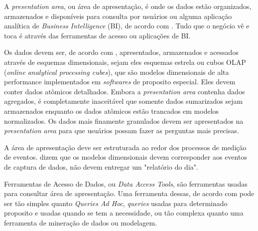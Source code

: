 A \textit{presentation area}, ou área de apresentação, é onde os dados estão organizados, armazenados e disponíveis para consulta por usuários ou alguma aplicação analítica de \textit{Business Intelligence} (BI), de acordo com . Tudo que o negócio vê e toca é através das ferramentas de acesso ou aplicações de BI.

Os dados devem ser, de acordo com , apresentados, armazenados e acessados através de esquemas dimensionais, sejam eles esquemas estrela ou cubos OLAP (\textit{online analytical processing cubes}), que são modelos dimensionais de alta performance implementados em \textit{softwares} de proposito especial. Eles devem conter dados atômicos detalhados. Embora a \textit{presentation area} contenha dados agregados, é completamente inaceitável que somente dados sumarizados sejam armazenados enquanto os dados atômicos estão trancados em modelos normalizados. Os dados mais finamente granulados devem ser apresentados na \textit{presentation area} para que usuários possam fazer as perguntas mais precisas.

A área de apresentação deve ser estruturada ao redor dos processos de medição de eventos.  dizem que os modelos dimensionais devem corresponder aos eventos de captura de dados, não devem entregar um "relatório do dia". 

 Ferramentas de Acesso de Dados, ou \textit{Data Access Tools}, são ferramentas usadas para consultar área de apresentação. Uma ferramenta dessas, de acordo com  pode ser tão simples quanto \textit{Queries Ad Hoc}, \textit{queries} usadas para determinado proposito e usadas quando se tem a necessidade, ou tão complexa quanto uma ferramenta de mineração de dados ou modelagem. 


